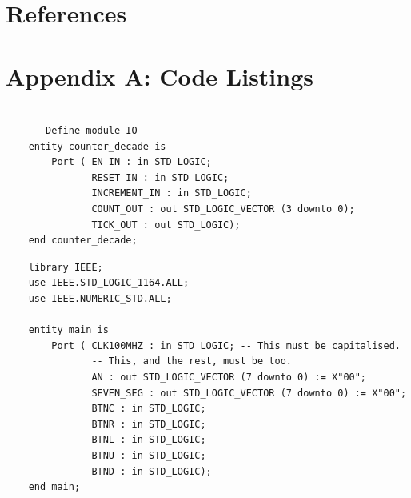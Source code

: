 \documentclass[11pt]{article}
\newenvironment{code}{\captionsetup{type=listing}}{}
\begin{document}
\newpage

\section{References}
\printbibliography

\newpage

\section{Appendix A: Code Listings}

\begin{code}
  \begin{verbatim}
  
    -- Define module IO
    entity counter_decade is
        Port ( EN_IN : in STD_LOGIC;
               RESET_IN : in STD_LOGIC;
               INCREMENT_IN : in STD_LOGIC;
               COUNT_OUT : out STD_LOGIC_VECTOR (3 downto 0);
               TICK_OUT : out STD_LOGIC);
    end counter_decade;

  \end{verbatim}
  \captionsetup{belowskip=0pt}
  \label{code:entity_naming_convention}
\end{code}

\vspace*{1cm}

\begin{code}
  \begin{verbatim}
    library IEEE;
    use IEEE.STD_LOGIC_1164.ALL;
    use IEEE.NUMERIC_STD.ALL;

    entity main is
        Port ( CLK100MHZ : in STD_LOGIC; -- This must be capitalised.
               -- This, and the rest, must be too.
               AN : out STD_LOGIC_VECTOR (7 downto 0) := X"00"; 
               SEVEN_SEG : out STD_LOGIC_VECTOR (7 downto 0) := X"00";
               BTNC : in STD_LOGIC;
               BTNR : in STD_LOGIC;
               BTNL : in STD_LOGIC;
               BTNU : in STD_LOGIC;
               BTND : in STD_LOGIC);  
    end main;
  \end{verbatim}
  \captionsetup{belowskip=0pt}
  \label{code:case}
\end{code}
\end{document}
